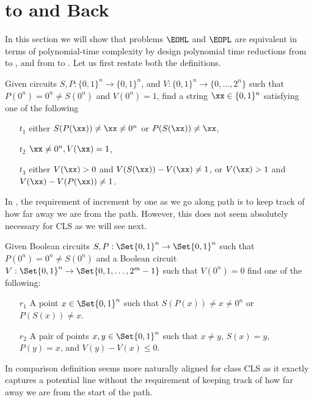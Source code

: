 \section{\EOML to \EOPL and Back}
In this section we will show that problems $\EOML$ and $\EOPL$ are equivalent in terms of polynomial-time complexity by design polynomial time reductions from \EOML to \EOPL, and from \EOPL to \EOML. Let us first restate both the definitions. 

\begin{definition}[\EOML]\cite{}
Given circuits $S,P: \{0,1\}^n \rightarrow \{0,1\}^n$, and $V:\{0,1\}^n\rightarrow \{0,\dots, 2^n\}$ such that $P(0^n) =0^n\neq S(0^n)$ and $V(0^n)=1$, find a string $\xx \in \{0,1\}^n$ satisfying one of the following 
\begin{enumerate}
\item[$t_1$] either $S(P(\xx))\neq \xx \neq 0^n$ or $P(S(\xx))\neq \xx$,
\item[$t_2$] $\xx\neq 0^n, V(\xx)=1$,
\item[$t_3$] either $V(\xx)>0$ and $V(S(\xx))-V(\xx)\neq 1$, or $V(\xx)>1$ and $V(\xx)-V(P(\xx))\neq 1$. 
\end{enumerate}
\end{definition}

In \EOML, the requirement of increment by one as we go along path is to keep track of how far away we are from the path. However, this does not seem absolutely necessary for CLS as we will see next. 

\begin{definition}[\EOPL]
Given Boolean circuits $S,P : \Set{0,1}^n \to \Set{0,1}^n$ such that $P(0^n) =0^n\neq S(0^n)$ and a Boolean circuit $V: \Set{0,1}^n \to \Set{0,1,\dotsc,2^m - 1}$ such that $V(0^n) = 0$ find one of the following:
\begin{enumerate}
\item[$r_1$] A point $x \in \Set{0,1}^n$ such that $S(P(x)) \neq x \neq 0^n$ or $P(S(x)) \neq x$.
\item[$r_2$] A pair of points $x, y \in \Set{0,1}^n$ such that $x \neq y$, $S(x) = y$, $P(y) = x$, and $V(y) - V(x) \leq 0$.
\end{enumerate}
\end{definition}

In comparison \EOPL definition seems more naturally aligned for class CLS as it exactly captures a potential line without the requirement of keeping track of how far away we are from the start of the path. 

